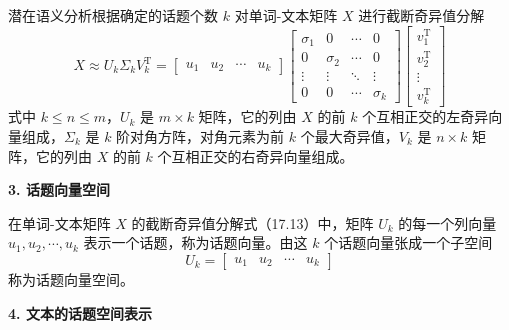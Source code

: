 \documentclass[UTF8, 12pt, fontset=fandol, oneside]{ctexart}
\begin{document}
潜在语义分析根据确定的话题个数 $k$ 对单词-文本矩阵 $X$ 进行截断奇异值分解
\begin{equation}
X\approx U_k\Sigma_kV_k^{\mathrm{T}}
=
\begin{bmatrix}
u_1 & u_2 & \cdots & u_k
\end{bmatrix}
\begin{bmatrix}
\sigma_1 & 0 & \cdots & 0\\
0 & \sigma_2 & \cdots & 0\\
\vdots & \vdots & \ddots & \vdots\\
0 & 0 & \cdots & \sigma_k
\end{bmatrix}
\begin{bmatrix}
v_1^{\mathrm{T}}\\
v_2^{\mathrm{T}}\\
\vdots\\
v_k^{\mathrm{T}}
\end{bmatrix}
\tag{17.13}
\end{equation}
式中 $k\leqslant n\leqslant m$，$U_k$ 是 $m\times k$ 矩阵，它的列由 $X$ 的前 $k$ 个互相正交的左奇异向量组成，$\Sigma_k$ 是 $k$ 阶对角方阵，对角元素为前 $k$ 个最大奇异值，$V_k$ 是 $n\times k$ 矩阵，它的列由 $X$ 的前 $k$ 个互相正交的右奇异向量组成。

\noindent\textbf{3. 话题向量空间}

在单词-文本矩阵 $X$ 的截断奇异值分解式（17.13）中，矩阵 $U_k$ 的每一个列向量 $u_1,u_2,\cdots,u_k$ 表示一个话题，称为话题向量。由这 $k$ 个话题向量张成一个子空间
\[
U_k=
\begin{bmatrix}
u_1 & u_2 & \cdots & u_k
\end{bmatrix}
\]
称为话题向量空间。

\noindent\textbf{4. 文本的话题空间表示}
\end{document}
